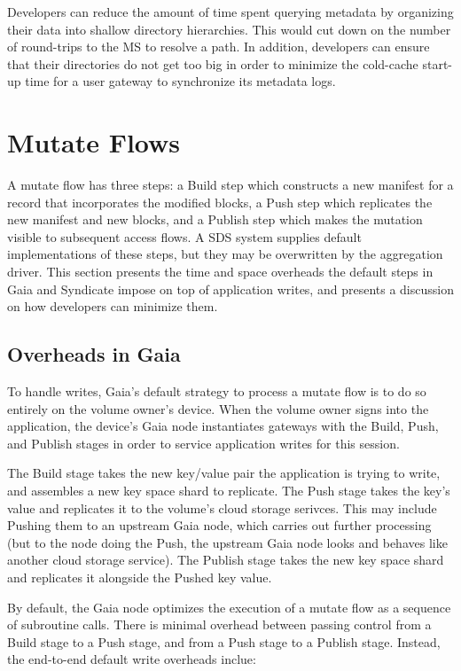 
Developers can reduce the amount of time spent querying metadata by organizing
their data into shallow directory hierarchies.  This would cut down on the
number of round-trips to the MS to resolve a path.  In addition, developers can
ensure that their directories do not get too big in order to minimize the
cold-cache start-up time for a user gateway to synchronize its metadata logs.

\section{Mutate Flows}

A mutate flow has three steps:  a Build step which constructs a new manifest
for a record that incorporates the modified blocks, a Push step which replicates
the new manifest and new blocks, and a Publish step which makes the mutation
visible to subsequent access flows.  A SDS system supplies default
implementations of these steps, but they may be overwritten by the aggregation
driver.  This section presents the time and space overheads the default steps in
Gaia and Syndicate impose on top of application writes, and presents a
discussion on how developers can minimize them.

\subsection{Overheads in Gaia}

To handle writes, Gaia's default strategy to process a
mutate flow is to do so entirely on the volume owner's device.  When the volume
owner signs into the application, the device's Gaia node instantiates gateways with the Build,
Push, and Publish stages in order to service application writes for this session.

The Build stage takes the new key/value pair the application is trying to write,
and assembles a new key space shard to replicate.  The Push stage takes the
key's value and replicates it to the volume's cloud storage
serivces.  This may include Pushing them to an upstream Gaia node, which carries
out further processing (but to the node doing the Push, the upstream Gaia node
looks and behaves like another cloud storage service).  The Publish stage takes
the new key space shard and replicates it alongside the Pushed key value.

By default, the Gaia node optimizes the execution of a mutate flow as a sequence
of subroutine calls.  There is minimal overhead between passing control from a
Build stage to a Push stage, and from a Push stage to a Publish stage.  Instead,
the end-to-end default write overheads inclue:

